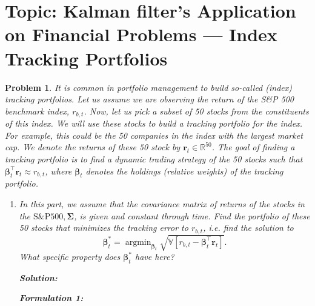 \documentclass[11pt]{article}
\theoremstyle{plain} %
\newtheorem{problem}[theorem]{Problem}
\newenvironment{solution}
{\color{C2}\normalfont\begin{framed}\begingroup\textbf{Solution:} }
  {\endgroup\end{framed}}
\theoremstyle{remark}
\begin{document}
\section{Topic: Kalman filter's Application on Financial Problems --- Index Tracking Portfolios}

\begin{problem}
It is common in portfolio management to build so-called (index) tracking
portfolios. Let us assume we are observing the return of the S\&P 500 benchmark
index, $r_{b, t}$. Now, let us pick a subset of 50 stocks from the constituents
of this index. We will use these stocks to build a tracking portfolio for the
index. For example, this could be the 50 companies in the index with the largest
market cap. We denote the returns of these 50 stock by $\mathbf{r}_t \in
  \mathbb{R}^{50}$. The goal of finding a tracking portfolio is to find a dynamic
trading strategy of the 50 stocks such that $\boldsymbol{\beta}_t^\top
  \mathbf{r}_t \approx r_{b, t}$, where $\boldsymbol{\beta}_t$ denotes the
holdings (relative weights) of the tracking portfolio.
\begin{enumerate}[label=(\alph*)]
  \item In this part, we assume that the covariance matrix of returns of the
        stocks in the $\mathrm{S} \& \mathrm{P} 500, \boldsymbol{\Sigma}$, is given
        and constant through time. Find the portfolio of these 50 stocks that
        minimizes the tracking error to $r_{b, t}$, i.e. find the solution to
        $$
          \boldsymbol{\beta}_t^*=\operatorname{argmin}_{\boldsymbol{\beta}_t} \sqrt{\mathbb{V}\left[r_{b, t}-\boldsymbol{\beta}_t^\top \mathbf{r}_t\right]} .
        $$
        What specific property does $\boldsymbol{\beta}_t^*$ have here?

        \begin{solution}

          \textbf{Formulation 1:}


\end{solution}
\end{enumerate}
\end{problem}
\end{document}
